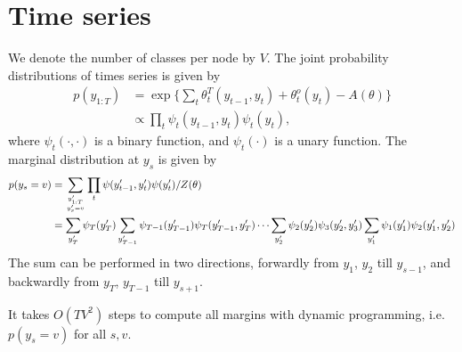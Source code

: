 \documentclass{article}
\begin{document}
\section{Time series}
We denote the number of classes per node by $V$. The joint probability distributions of times series is given by
\begin{align*}
p(y_{1:T})&=\exp\{\sum_{t}\theta_t^T(y_{t-1},y_t)+\theta_t^{o}(y_t)-A(\theta)\}\\
                &\propto \prod_t\psi_t(y_{t-1},y_t) \psi_t(y_t),
\end{align*}
where $\psi_t(\cdot,\cdot)$ is a binary function, and $\psi_t(\cdot)$ is a unary function. The marginal distribution at $y_s$ is given by
\begin{align*}
p(y_s=v)
&=\sum_{y'_{1:T}\atop y'_s=v}\prod_{t}\psi(y'_{t-1},y_t')\psi(y'_t)/Z(\theta)\\
&=\sum_{y_T'}\psi_T(y_T')\sum_{y_{T-1}'}\psi_{T-1}(y_{T-1}')\psi_T(y_{T-1}', y_{T}')
\cdots \sum_{y_2'}\psi_{2}(y_{2}')\psi_3(y_{2}', y_{3}')\sum_{y_1'}\psi_{1}(y_{1}')\psi_2(y_{1}', y_{2}')
\end{align*}
The sum can be performed in two directions, forwardly from $y_1$, $y_2$ till $y_{s-1}$, and backwardly from $y_T$, $y_{T-1}$ till $y_{s+1}$.
\begin{center}
\end{center}

It takes $O(TV^2)$ steps to compute all margins with dynamic programming, i.e. $p(y_s=v)$ for all $s,v$.
\end{document}
